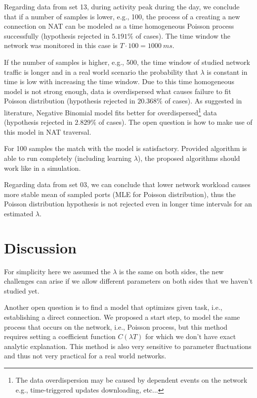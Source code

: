 \documentclass[twoside]{article}
\begin{document}
\begin{multicols}{2}
Regarding data from set 13, during activity peak during the day, we conclude that if a number of samples 
is lower, e.g., 100, the process of a creating a new connection on NAT can 
be modeled as a time homogeneous Poisson process successfully (hypothesis rejected in $5.191\%$ of cases).
The time window the network was monitored in this case is $T \cdot 100 = 1000~ms$. 

If the number of samples is higher, e.g., 500, the time window of studied network traffic is longer and
in a real world scenario the probability that $\lambda$ is constant in time is low with increasing the time
window. Due to this time homogeneous model is not strong enough, data is 
overdispersed what causes failure to fit Poisson distribution (hypothesis rejected in $20.368\%$ of cases). As suggested
in literature, Negative Binomial model fits better for overdispersed\footnote{The data overdispersion may be caused by dependent events on the network e.g., time-triggered updates downloading, etc...}
data (hypothesis rejected in $2.829\%$ of cases). 
The open question is how to make use of this model in NAT traversal.

For 100 samples the match with the model is satisfactory. Provided algorithm is able to run completely (including learning $\lambda$),
the proposed algorithms should work like in a simulation.

Regarding data from set 03, we can conclude that lower network workload causes more stable mean of sampled ports (MLE for Poisson distribution),
thus the Poisson distribution hypothesis is not rejected even in longer time intervals for an estimated $\lambda$. 





\section{Discussion}
For simplicity here we assumed the $\lambda$ is the same on both sides, the new challenges 
can arise if we allow different parameters on both sides that we haven't studied yet.

Another open question is to find a model that optimizes given task, i.e., establishing a direct
connection. We proposed a start step, to model the same process that occurs on the network, i.e.,
Poisson process, but this method requires setting a coefficient function $C(\lambda T)$ for which 
we don't have exact analytic explanation. This method is also very sensitive to parameter fluctuations
and thus not very practical for a real world networks. 


\end{multicols}
\end{document}

